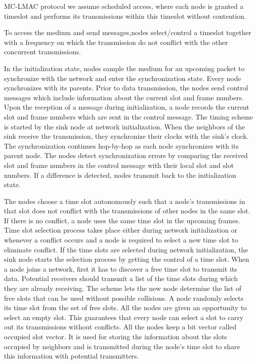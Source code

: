 MC-LMAC protocol we assume scheduled access, where each node is granted a timeslot and performs its transmissions within this timeslot without contention. 

To access the medium and send messages,nodes select/control a timeslot together with a frequency on which the transmission do not conflict with the other concurrent transmissions. 

In the initialization state, nodes sample the medium for an upcoming packet to synchronize with the network and enter the synchronization state. Every node synchronizes with its parents. Prior to data transmission, the nodes send control messages which include information about the current slot and frame numbers. Upon the reception of a message during initialization, a node records the current slot and frame numbers which are sent in the control message. The timing scheme is started by the sink node at network initialization. When the neighbors of the sink receive the transmission, they synchronize their clocks with the sink's clock. The synchronization continues hop-by-hop as each node synchronizes with its parent node. The nodes detect synchronization errors by comparing the received slot and frame numbers in the control message with their local slot and slot numbers. If a difference is detected, nodes transmit back to the initialization state. 

The nodes choose a time slot autonomously such that a node's transmissions in that slot does not conflict with the transmissions of other nodes in the same slot. If there is no conflict, a node uses the same time slot in the upcoming frames. Time slot selection process takes place either during network initialization or whenever a conflict occurs and a node is required to select a new time slot to eliminate conflict. If the time slots are selected during network initialization, the sink node starts the selection process by getting the control of a time slot. When a node joins a network, first it has to discover a free time slot to transmit its data. Potential receivers should transmit a list of the time slots during which they are already receiving. The scheme lets the new node determine the list of free slots that can be used without possible collisions. A node randomly selects its time slot from the set of free slots. All the nodes are given an opportunity to select an empty slot. This guarantees that every node can select a slot to carry out its transmissions without conflicts. All the nodes keep a bit vector called occupied slot vector. It is used for storing the information about the slots occupied by neighbors and is transmitted during the node's time slot to share this information with potential transmitters. 

